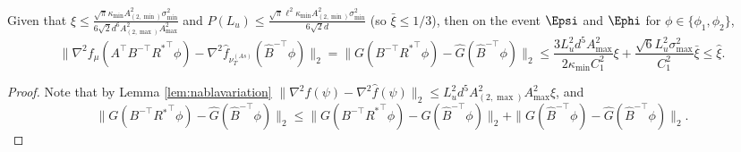 \begin{lemma}
\label{lem:Binversenablavariation1}
Given that $\xi \le \frac{\sqrt{\pi}\kappa_{\min}A^2_{(2,\min)}\sigma_{\min}^2}{6\sqrt{2}d^6A_{(2,\max)}^2A_{\max}^2}$ and $P(L_u) \le \frac{\sqrt{\pi}\ell^2\kappa_{\min}A^2_{(2,\min)}\sigma_{\min}^2}{6\sqrt{2}d}$
(so $\bar{\xi} \le 1/3$), then on the event $\Epsi$ and $\Ephi$ for $\phi \in \{\phi_1, \phi_2\}$,
\[
\|\nabla^2 f_{\mu}(A^{\top}B^{-\top}{R^*}^{\top}\phi) - \nabla^2 \hat{f}_{\nu_T^{(As)}}(\hat{B}^{-\top}\phi)  \|_2 
= \|G(B^{-\top}{R^*}^{\top}\phi) - \hat{G}(\hat{B}^{-\top}\phi)\|_2
\le 
\frac{3L_u^2d^5A^2_{\max}}{2\kappa_{\min}C_1^2}\xi + \frac{\sqrt{6}L_u^2\sigma_{\max}^2}{C_1^2}\bar{\xi}
\le \hat{\xi}.
\]
\end{lemma}
\begin{proof}
Note that by Lemma \ref{lem:nablavariation} $\|\nabla^2 f(\psi) - \nabla^2 \hat{f}(\psi)\|_2 \le L_u^2  d^5 A_{(2,\max)}^2A_{\max}^2\xi$, and 
\[
\|G(B^{-\top}R{^*}^{\top}\phi) - \hat{G}(\hat{B}^{-\top}\phi)\|_2
\le 
\|G(B^{-\top}{R^*}^{\top}\phi) - G(\hat{B}^{-\top}\phi)\|_2
+ \|G(\hat{B}^{-\top}\phi) - \hat{G}(\hat{B}^{-\top}\phi)\|_2.
\]


\end{proof}
